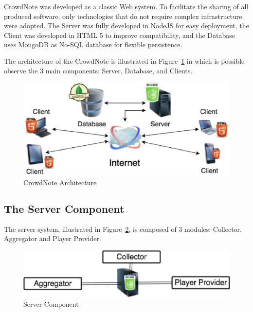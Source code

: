 CrowdNote was developed as a classic Web system. To facilitate the sharing of all produced software, only technologies that do not require complex infrastructure were adopted. The Server was fully developed in NodeJS for easy deployment, the Client was developed in HTML 5 to improve compatibility, and the Database uses MongoDB as No-SQL database for flexible persistence.

The architecture of the CrowdNote is illustrated in Figure~\ref{architecture} in which is possible observe the 3 main components: Server, Database, and Clients.

\begin{figure}[h!]
	\centerline{\includegraphics[scale=0.3] {figure/Architecture}}
	\caption{CrowdNote Architecture}
	\label{architecture}
\end{figure}


\subsection{The Server Component}
The server system, illustrated in Figure~\ref{server}, is composed of 3 modules: Collector, Aggregator and Player Provider.

\begin{figure}[h!]
	\centerline{\includegraphics[scale=0.4] {figure/server}}
	\caption{Server Component}
	\label{server}
\end{figure}

